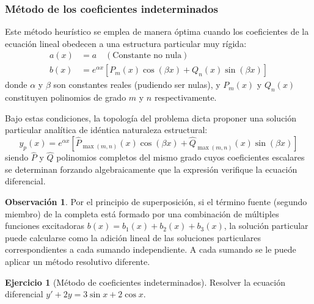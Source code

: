 \documentclass[11pt,a4paper]{article}
\theoremstyle{definition}
\newtheorem{exercise}{Ejercicio}[section]
\newtheorem{remark}{Observación}[section]
\theoremstyle{plain}
\begin{document}
\subsubsection{Método de los coeficientes indeterminados}

Este método heurístico se emplea de manera óptima cuando los coeficientes de la ecuación lineal obedecen a una estructura particular muy rígida:
\begin{align*}
    a(x) &= a \quad (\text{Constante no nula}) \\
    b(x) &= e^{\alpha x} [P_m(x)\cos(\beta x) + Q_n(x)\sin(\beta x)]
\end{align*}
donde $\alpha$ y $\beta$ son constantes reales (pudiendo ser nulas), y $P_m(x)$ y $Q_n(x)$ constituyen polinomios de grado $m$ y $n$ respectivamente.

Bajo estas condiciones, la topología del problema dicta proponer una solución particular analítica de idéntica naturaleza estructural:
$$ y_p(x) = e^{\alpha x} [\hat{P}_{\max(m,n)}(x)\cos(\beta x) + \hat{Q}_{\max(m,n)}(x)\sin(\beta x)] $$
siendo $\hat{P}$ y $\hat{Q}$ polinomios completos del mismo grado cuyos coeficientes escalares se determinan forzando algebraicamente que la expresión verifique la ecuación diferencial.

\begin{remark}
Por el principio de superposición, si el término fuente (segundo miembro) de la completa está formado por una combinación de múltiples funciones excitadoras $b(x) = b_1(x) + b_2(x) + b_3(x)$, la solución particular puede calcularse como la adición lineal de las soluciones particulares correspondientes a cada sumando independiente. A cada sumando se le puede aplicar un método resolutivo diferente.
\end{remark}

\begin{exercise}[Método de coeficientes indeterminados]
Resolver la ecuación diferencial $y' + 2y = 3\sin x + 2\cos x$.
\end{exercise}
\end{document}
